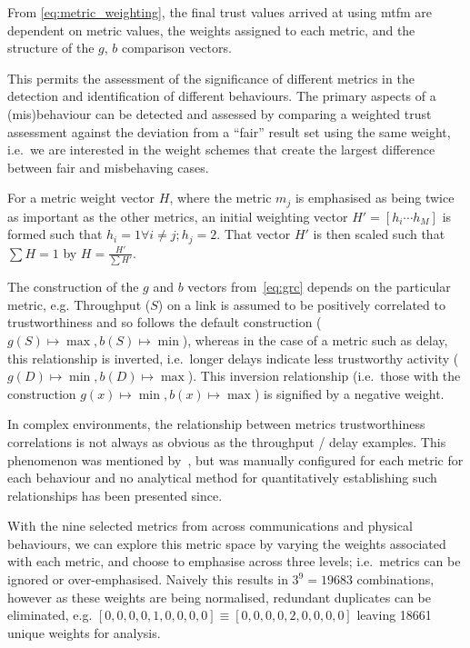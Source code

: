 From \eqref{eq:metric_weighting}, the final trust values arrived at using \gls{mtfm} are dependent on metric values, the weights assigned to each metric, and the structure of the $g$, $b$ comparison vectors.

This permits the assessment of the significance of different metrics in the detection and identification of different behaviours. 
The primary aspects of a (mis)behaviour can be detected and assessed by comparing a weighted trust assessment against the deviation from a ``fair'' result set using the same weight, i.e.\ we are interested in the weight schemes that create the largest difference between fair and misbehaving cases.

For a metric weight vector $H$, where the metric $m_j$ is emphasised as being twice as important as the other metrics, an initial weighting vector $H'=[h_i\cdots h_M]$ is formed such that $h_i = 1 \forall i \ne j; h_j=2$. That vector $H'$ is then scaled such that $\sum H = 1$ by $H= \frac{H'}{\sum H'}$.

The construction of the $g$ and $b$ vectors from~\eqref{eq:grc} depends on the particular metric, e.g. Throughput ($S$) on a link is assumed to be positively correlated to trustworthiness and so follows the default construction ($g(S) \mapsto \max, b(S) \mapsto \min$), whereas in the case of a metric such as delay, this relationship is inverted, i.e.\ longer delays indicate less trustworthy activity ($g(D) \mapsto \min, b(D) \mapsto \max$).
This inversion relationship (i.e.\ those with the construction $g(x) \mapsto \min, b(x) \mapsto \max$) is signified by a negative weight.

In complex environments, the relationship between metrics trustworthiness correlations is not always as obvious as the throughput / delay examples.
This phenomenon was mentioned by~\citet{Guo2012}, but was manually configured for each metric for each behaviour and no analytical method for quantitatively establishing such relationships has been presented since.

With the nine selected metrics from across communications and physical behaviours, we can explore this metric space by varying the weights associated with each metric, and choose to emphasise across three levels; i.e.\ metrics can be ignored or over-emphasised. Naively this results in $3^9 = 19683$ combinations, however as these weights are being normalised, redundant duplicates can be eliminated, e.g. $[0,0,0,0,1,0,0,0,0] \equiv [0,0,0,0,2,0,0,0,0]$ leaving 18661 unique weights for analysis.

